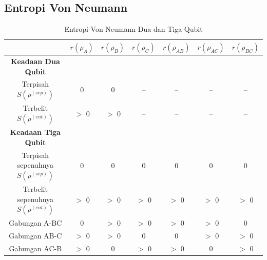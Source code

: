 \subsection{Entropi Von Neumann}

\begin{table}[h]
\centering
\caption{Entropi Von Neumann Dua dan Tiga Qubit}
\begin{tabular}{|c|c|c|c|c|c|c|}
\hline
 & $r(\rho_A)$ & $r(\rho_B)$ & $r(\rho_C)$ & $r(\rho_{AB})$ & $r(\rho_{AC})$ & $r(\rho_{BC})$ \\
\hline
\textbf{Keadaan Dua Qubit} & & & & & & \\
\hline
Terpisah $S(\rho^{(sep)})$ & 0 & 0 & -- & -- & -- & -- \\
\hline
Terbelit $S(\rho^{(ent)})$ & $>$ 0 & $>$ 0 & -- & -- & -- & -- \\
\hline
\textbf{Keadaan Tiga Qubit} & & & & & & \\
\hline
Terpisah sepenuhnya $S(\rho^{(sep)})$ & 0 & 0 & 0 & 0 & 0 & 0 \\
\hline
Terbelit sepenuhnya $S(\rho^{(ent)})$ & $>$ 0 & $>$ 0 & $>$ 0 & $>$ 0 & $>$ 0 & $>$ 0 \\
\hline
Gabungan A-BC & 0 & $>$ 0 & $>$ 0 & $>$ 0 & $>$ 0 & 0 \\
\hline
Gabungan AB-C & $>$ 0 & $>$ 0 & 0 & 0 & $>$ 0 & $>$ 0 \\
\hline
Gabungan AC-B & $>$ 0 & 0 & $>$ 0 & $>$ 0 & 0 & $>$ 0 \\
\hline
\end{tabular}
\end{table}

